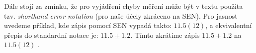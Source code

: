 

Dále stojí za zmínku, že pro vyjádření chyby měření může být v textu použita tzv. \textit{shorthand error notation} \cite{shorthand_error_notation} (pro naše účely zkráceno na SEN). Pro jasnost uvedeme příklad, kde zápis pomocí SEN vypadá takto: $11.5(12)$, a ekvivalentní přepis do standardní notace je: $11.5 \pm 1.2$. Tímto zkrátíme zápis $11.5 \pm 1.2$ na $11.5(12)$ \cite{shorthand_error_notation_stack_exchange}.